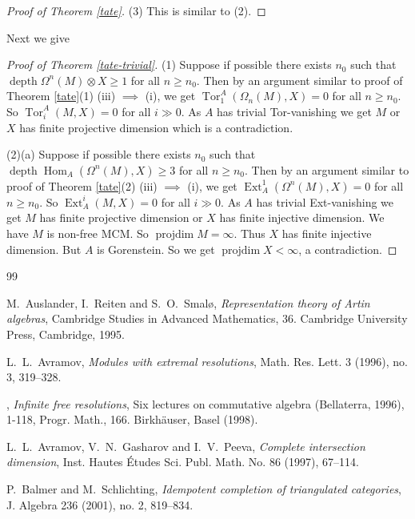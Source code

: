 \documentclass{amsart}
\newcommand{\depth}{\operatorname{depth}}
\newcommand{\projdim}{\operatorname{projdim}}
\newcommand{\Hom}{\operatorname{Hom}}
\newcommand{\Ext}{\operatorname{Ext}}
\newcommand{\Tor}{\operatorname{Tor}}
\theoremstyle{plain}
\theoremstyle{definition}
\theoremstyle{remark}
\begin{document}
{\begin{proof}[Proof of Theorem \ref{tate}]
(3) This is similar to (2).
\end{proof}

Next we give
\begin{proof}[Proof of Theorem \ref{tate-trivial}]
(1)  Suppose if possible  there exists $n_0$ such that \\ $\depth \Omega^n(M)\otimes X  \geq 1$ for all $n \geq n_0$. Then by an argument similar to proof of Theorem \ref{tate}(1)
 (iii) $\implies$ (i), we get $\Tor_1^A(\Omega_n(M), X) = 0$ for all $n \geq n_{0}$. So $\Tor^A_i(M, X) = 0$ for all $i \gg 0$. As $A$ has trivial Tor-vanishing we get $M$ or $X$ has finite projective dimension which is a contradiction.

(2)(a) Suppose if possible  there exists $n_0$ such that $\depth \Hom_A(\Omega^n(M), X)  \geq 3$ for all $n \geq n_0$. Then by an argument similar to proof of Theorem \ref{tate}(2) (iii) $\implies$ (i), we get $\Ext^1_A(\Omega^n(M), X) = 0$ for all $n \geq n_{0}$. So $\Ext_A^i(M, X) = 0$ for all $i \gg 0$. As $A$ has trivial Ext-vanishing we get $M$  has finite projective dimension or $X$ has finite injective  dimension. We have $M$ is non-free MCM. So $\projdim M = \infty$. Thus $X$ has finite injective dimension. But $A$ is Gorenstein. So we get $\projdim X < \infty$, a contradiction.

\end{proof}
\begin{thebibliography} {99}





M.~Auslander, I.~Reiten and S.~O.~Smal\o,
\emph{Representation theory of Artin algebras},
Cambridge Studies in Advanced Mathematics, 36. Cambridge University Press, Cambridge, 1995.

L.~L.~Avramov,
\emph{Modules with extremal resolutions},
Math. Res. Lett. 3 (1996), no. 3, 319--328.

\bysame,
\emph{Infinite free resolutions},
Six lectures on commutative algebra (Bellaterra, 1996), 1-118, Progr. Math., 166. Birkhäuser, Basel (1998).

 L.~L.~Avramov, V.~N.~Gasharov and I.~V.~Peeva,
\emph{Complete intersection dimension},
Inst. Hautes Études Sci. Publ. Math. No. 86 (1997), 67--114.

P.~Balmer and  M.~Schlichting,
\emph{Idempotent completion of triangulated categories},
J. Algebra 236 (2001), no. 2, 819--834.


\end{thebibliography}}
\end{document}
